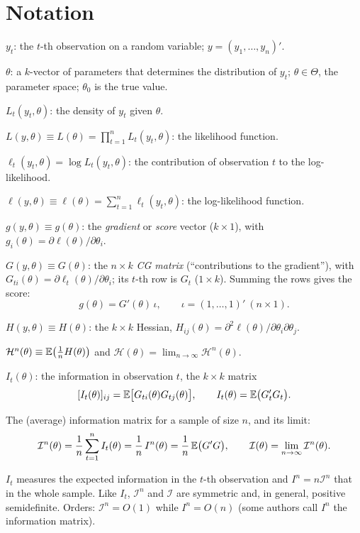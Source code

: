 \documentclass[11pt]{article}
\begin{document}
\section{Notation}

\begin{flatlist}
 \item $y_{t}$: the $t$-th observation on a random variable; $y=(y_{1},\ldots,y_{n})'$.
 \item $\theta$: a $k$-vector of parameters that determines the distribution of $y_{t}$;
       $\theta\in\Theta$, the parameter space; $\theta_{0}$ is the true value.
 \item $L_{t}(y_{t},\theta)$: the density of $y_{t}$ given $\theta$.
 \item $L(y,\theta)\equiv L(\theta)=\prod_{t=1}^{n}L_{t}(y_{t},\theta)$: the likelihood function.
 \item $\ell_{t}(y_{t},\theta)=\log L_{t}(y_{t},\theta)$: the contribution of observation $t$ to the
       log-likelihood.
 \item $\ell(y,\theta)\equiv\ell(\theta)=\sum_{t=1}^{n}\ell_{t}(y_{t},\theta)$: the log-likelihood function.
 \item $g(y,\theta)\equiv g(\theta)$: the \emph{gradient} or \emph{score} vector ($k\times1$), with
       $g_{i}(\theta)=\partial\ell(\theta)/\partial\theta_{i}$.
 \item $G(y,\theta)\equiv G(\theta)$: the $n\times k$ \emph{CG matrix} (``contributions to the
       gradient''), with $G_{ti}(\theta)=\partial\ell_{t}(\theta)/\partial\theta_{i}$; its $t$-th row is $G_{t}$
       ($1\times k$). Summing the rows gives the score:
       \[ g(\theta)=G'(\theta)\,\iota, \qquad \iota=(1,\ldots,1)'\ (n\times1). \]
 \item $H(y,\theta)\equiv H(\theta)$: the $k\times k$ Hessian, $H_{ij}(\theta)=\partial^{2}\ell(\theta)/\partial\theta_{i}\partial\theta_{j}$.
 \item $\mathcal H^{n}(\theta)\equiv\mathbb{E}\bigl(\tfrac1nH(\theta)\bigr)$ and
       $\mathcal H(\theta)=\lim_{n\to\infty}\mathcal H^{n}(\theta)$.
 \item $I_{t}(\theta)$: the information in observation $t$, the $k\times k$ matrix
       \[ [I_{t}(\theta)]_{ij}=\mathbb{E}\bigl[G_{ti}(\theta)G_{tj}(\theta)\bigr], \qquad
          I_{t}(\theta)=\mathbb{E}\bigl(G_{t}'G_{t}\bigr). \]
 \item The (average) information matrix for a sample of size $n$, and its limit:
       \[ \mathcal I^{n}(\theta)=\frac1n\sum_{t=1}^{n}I_{t}(\theta)=\frac1n\,I^{n}(\theta)
          =\frac1n\,\mathbb{E}\bigl(G'G\bigr), \qquad
          \mathcal I(\theta)=\lim_{n\to\infty}\mathcal I^{n}(\theta). \]
\end{flatlist}
$I_{t}$ measures the expected information in the $t$-th observation and $I^{n}=n\mathcal I^{n}$
that in the whole sample. Like $I_{t}$, $\mathcal I^{n}$ and $\mathcal I$ are symmetric and, in
general, positive semidefinite. Orders: $\mathcal I^{n}=O(1)$ while $I^{n}=O(n)$ (some authors call
$I^{n}$ the information matrix).
\end{document}
